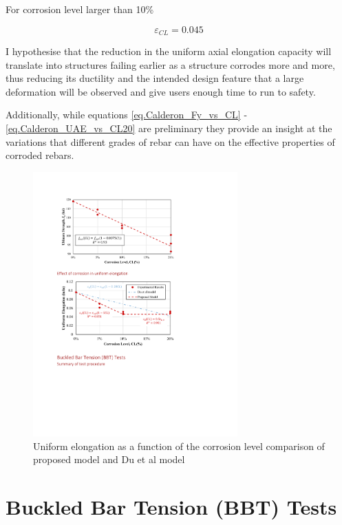 For corrosion level larger than 10\%

\begin{equation}
    \varepsilon_{CL} = 0.045
    \label{eq.Calderon_UAE_vs_CL20}
\end{equation}

I hypothesise that the reduction in the uniform axial elongation capacity will translate into structures failing earlier as a structure corrodes more and more, thus reducing its ductility and the intended design feature that a large deformation will be observed and give users enough time to run to safety.

Additionally, while equations \ref{eq.Calderon_Fy_vs_CL} - \ref{eq.Calderon_UAE_vs_CL20} are preliminary they provide an insight at the variations that different grades of rebar can have on the effective properties of corroded rebars.

\begin{figure}[htbp]
	\centering
	\includegraphics[width=0.7\textwidth]{VAC Thesis 2.0/Chapter-4/figs/TensionTest_results_4_proposedmodel.pdf}
	\caption{Uniform elongation as a function of the corrosion level comparison of proposed model and Du et al model \cite{Du2005}}
	\label{fig:UAE_vs_CL}
\end{figure}

\section{Buckled Bar Tension (BBT) Tests}
